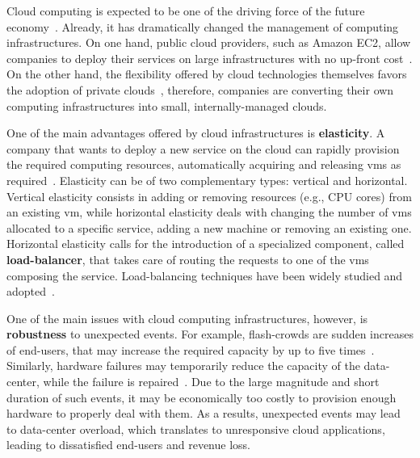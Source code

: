 Cloud computing is expected to be one of the driving force of the
future economy~\citep{WPonMckinsey13}. Already, it has dramatically
changed the management of computing infrastructures. On one hand,
public cloud providers, such as Amazon EC2, allow companies to deploy
their services on large infrastructures with no up-front
cost~\citep{Buyya09:FGCS}. On the other hand, the flexibility offered
by cloud technologies themselves favors the adoption of private
clouds~\citep{Gulati11:HotCloud}, therefore, companies are converting
their own computing infrastructures into small, internally-managed
clouds.

One of the main advantages offered by cloud infrastructures is {\bf
  elasticity}. A company that wants to deploy a new service on the
cloud can rapidly provision the required computing resources,
automatically acquiring and releasing \acp{vm} as
required~\citep{Herbst13:ICAC}.  Elasticity can be of two
complementary types: vertical and horizontal. Vertical elasticity
consists in adding or removing resources (e.g., CPU cores) from an
existing \ac{vm}, while horizontal elasticity deals with changing the
number of \acp{vm} allocated to a specific service, adding a new
machine or removing an existing one.
%
Horizontal elasticity calls for the introduction of a specialized
component, called {\bf load-balancer}, that takes care of routing the
requests to one of the \acp{vm} composing the service. Load-balancing
techniques have been widely studied and
adopted~\citep{Barroso09,Lu11:PerfEval,Lin12:IGCC,BeesBased:ADAPTIVE}.

One of the main issues with cloud computing infrastructures, however,
is {\bf robustness} to unexpected events. For example, flash-crowds
are sudden increases of end-users, that may increase the required
capacity by up to five times~\citep{Bodik10:SoCC}. Similarly, hardware
failures may temporarily reduce the capacity of the data-center, while
the failure is repaired~\citep{Barroso09}. Due to the large magnitude
and short duration of such events, it may be economically too costly
to provision enough hardware to properly deal with them. As a results,
unexpected events may lead to data-center overload, which translates
to unresponsive cloud applications, leading to dissatisfied end-users
and revenue loss.

